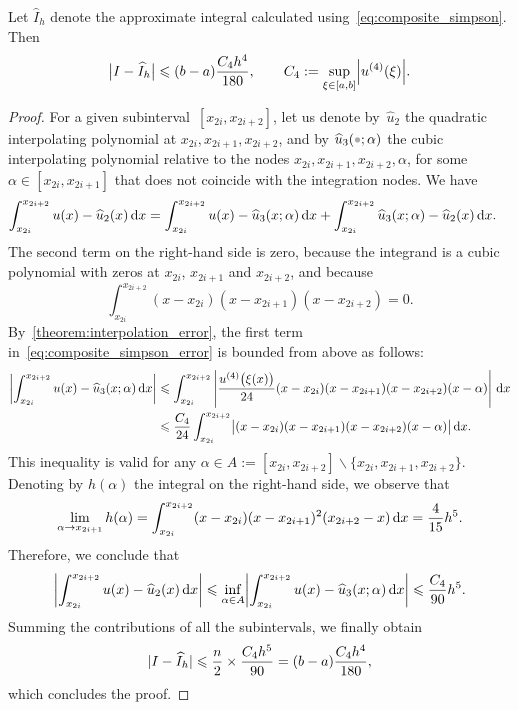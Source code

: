 \begin{theorem}
    Let $\widehat I_h$ denote the approximate integral calculated using~\eqref{eq:composite_simpson}.
    Then
    \begin{equation}
        \label{eq:error_bound_simpson}
        \bigl\lvert I - \widehat I_h \bigr\rvert
        \leq (b-a)\frac{C_4 h^4}{180},
        \qquad
        C_4 := \sup_{\xi \in [a, b]} \abs*{u^{(4)}(\xi)}.
    \end{equation}
\end{theorem}
\begin{proof}
For a given subinterval~$[x_{2i}, x_{2i+2}]$,
let us denote by~$\widehat u_2$ the quadratic interpolating polynomial at $x_{2i}, x_{2i+1}, x_{2i+2}$,
and by $\widehat u_3(\placeholder; \alpha)$ the cubic interpolating polynomial relative to the nodes $x_{2i}, x_{2i+1}, x_{2i+2}, \alpha$,
for some $\alpha \in [x_{2i}, x_{2i+1}]$ that does not coincide with the integration nodes.
We have
\begin{align}
    \label{eq:composite_simpson_error}
    \int_{x_{2i}}^{x_{2i+2}} u(x) - \widehat u_2(x) \, \d x
    &= \int_{x_{2i}}^{x_{2i+2}} u(x) - \widehat u_3(x; \alpha)  \, \d x + \int_{x_{2i}}^{x_{2i+2}} \widehat u_3(x; \alpha) - \widehat u_2(x)  \, \d x.
\end{align}
The second term on the right-hand side is zero,
because the integrand is a cubic polynomial with zeros at $x_{2i}$, $x_{2i+1}$ and $x_{2i+2}$,
and because
\[
    \int_{x_{2i}}^{x_{2i+2}} (x - x_{2i}) (x - x_{2i+1}) (x - x_{2i+2}) = 0.
\]
By~\cref{theorem:interpolation_error},
the first term in~\eqref{eq:composite_simpson_error} is bounded from above as follows:
\begin{align*}
    \abs*{\int_{x_{2i}}^{x_{2i+2}} u(x) - \widehat u_3(x; \alpha)  \, \d x}
    &\leq \int_{x_{2i}}^{x_{2i+2}} \left\lvert \frac{u^{(4)} \bigl(\xi(x)\bigr)}{24} (x-x_{2i})(x- x_{2i+1}) (x-x_{2i+2}) (x - \alpha) \right\rvert \, \d x \\
    &\leq \frac{C_4}{24} \int_{x_{2i}}^{x_{2i+2}} \bigl\lvert (x-x_{2i})(x- x_{2i+1}) (x-x_{2i+2}) (x - \alpha) \bigr\rvert \, \d x.
\end{align*}
This inequality is valid for any $\alpha \in A := [x_{2i}, x_{2i+2}] \backslash \{x_{2i}, x_{2i+1}, x_{2i+2}\}$.
Denoting by $h(\alpha)$ the integral on the right-hand side,
we observe that
\[
    \lim_{\alpha \to x_{2i+1}} h(\alpha) =
    \int_{x_{2i}}^{x_{2i+2}} (x-x_{2i})(x- x_{2i+1})^2 (x_{2i+2} - x) \, \d x = \frac{4}{15} h^5.
\]
Therefore, we conclude that
\[
    \abs*{\int_{x_{2i}}^{x_{2i+2}} u(x) - \widehat u_2(x)  \, \d x}
    \leq \inf_{\alpha \in A} \abs*{\int_{x_{2i}}^{x_{2i+2}} u(x) - \widehat u_3(x; \alpha)  \, \d x} \leq \frac{C_4}{90} h^5.
\]
Summing the contributions of all the subintervals,
we finally obtain
\begin{equation}
    \label{eq:scaling_error}
    \abs{I - \widehat I_h} \leq  \frac{n}{2} \times \frac{C_4 h^5}{90} = (b-a)\frac{C_4 h^4}{180},
\end{equation}
which concludes the proof.
\end{proof}

